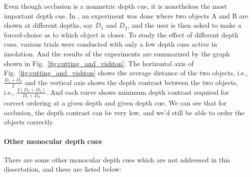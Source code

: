 

Even though occlusion is a nonmetric depth cue, it is nonetheless the most important depth cue. 
In \citet{cutting1995perceiving}, an experiment was done where two objects A and B are shown at different depths, say $D_1$ and $D_2$, and the user is then asked to make a forced-choice as to which object is closer. 
To study the effect of different depth cues, various trials were conducted with only a few depth cues active in insolation. 
And the results of the experiments are summarized by the graph shown in Fig.~\ref{fig:cutting_and_vishton}. 
The horizontal axis of Fig.~\ref{fig:cutting_and_vishton} shows the average distance of the two objects, i.e., $\frac{D_1 + D_2}{2}$ and the vertical axis shows the depth contrast between the two objects, i.e., $\frac{2\left(D_1 + D_2\right)}{D_1 + D_2}$.
And each curve shows minimum depth contrast required for correct ordering at a given depth and given depth cue. 
We can see that for occlusion, the depth contrast can be very low, and we’d still be able to order the objects correctly. 

\paragraph{Other monocular depth cues} There are some other monocular depth cues which are not addressed in this dissertation, and these are listed below:

